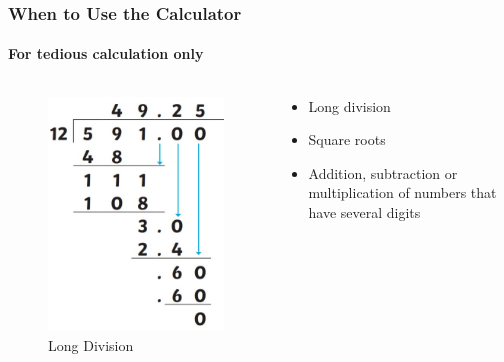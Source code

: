 \documentclass[
	11pt, %
]{beamer}
\begin{document}
\begin{frame}
	\frametitle{When to Use the Calculator}
	\framesubtitle{For tedious calculation only}
	\begin{columns}
		\begin{column}{0.5\textwidth}
			\begin{figure}
			    \includegraphics[width=0.7\linewidth]{Long_Division.jpeg}
			    \caption{Long Division}
		    \end{figure}
		\end{column}

		\begin{column}{0.5\textwidth}
		    \begin{itemize}
				\item Long division
				\item Square roots
				\item Addition, subtraction or multiplication of numbers that have several digits
		    \end{itemize}
		\end{column}
	\end{columns}
\end{frame}
\end{document}
